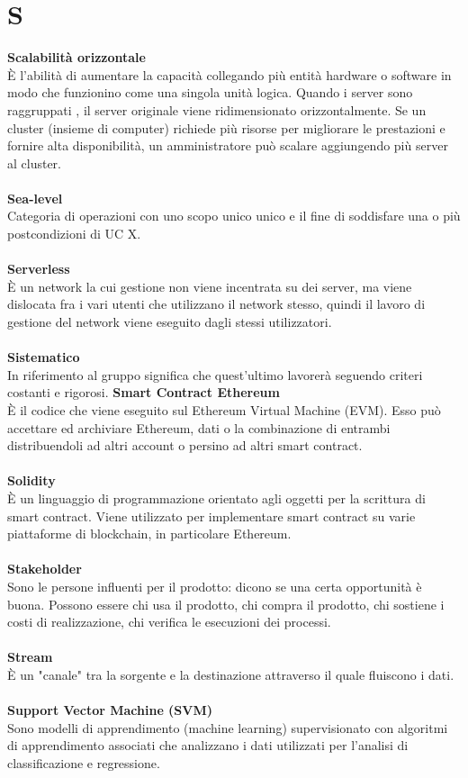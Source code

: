 \section{S}
\textbf{Scalabilità orizzontale}\\
È l'abilità di aumentare la capacità collegando più entità hardware o software in modo che funzionino come una singola unità logica. Quando i server sono raggruppati , il server originale viene ridimensionato orizzontalmente. Se un cluster (insieme di computer) richiede più risorse per migliorare le prestazioni e fornire alta disponibilità, un amministratore può scalare aggiungendo più server al cluster. \\ \\
\textbf{Sea-level}\\
Categoria di operazioni con uno scopo unico unico e il fine di soddisfare una o più postcondizioni di UC X. \\ \\
\textbf{Serverless}\\
È un network la cui gestione non viene incentrata su dei server, ma viene dislocata fra i vari utenti che utilizzano il network stesso, quindi il lavoro di gestione del network viene eseguito dagli stessi utilizzatori. \\ \\
\textbf{Sistematico}\\
In riferimento al gruppo \Gruppo{} significa che quest'ultimo lavorerà seguendo criteri costanti e rigorosi.
\textbf{Smart Contract Ethereum}\\
È il codice che viene eseguito sul Ethereum Virtual Machine (EVM). Esso può accettare ed archiviare Ethereum, dati o la combinazione di entrambi distribuendoli ad altri account o persino ad altri smart contract. \\ \\
\textbf{Solidity}\\
È un linguaggio di programmazione orientato agli oggetti per la scrittura di smart contract. Viene utilizzato per implementare smart contract su varie piattaforme di blockchain, in particolare Ethereum. \\ \\
\textbf{Stakeholder}\\
Sono le persone influenti per il prodotto: dicono se una certa opportunità è buona. Possono essere chi usa il prodotto, chi compra il prodotto, chi sostiene i costi di realizzazione, chi verifica le esecuzioni dei processi. \\ \\
\textbf{Stream}\\
È un "canale" tra la sorgente e la destinazione attraverso il quale fluiscono i dati. \\ \\
\textbf{Support Vector Machine (SVM)}\\
Sono modelli di apprendimento (machine learning) supervisionato con algoritmi di apprendimento associati che analizzano i dati utilizzati per l'analisi di classificazione e regressione. \\ \\
\clearpage
